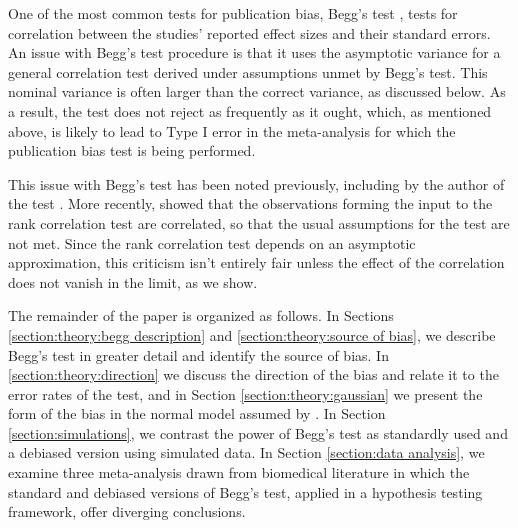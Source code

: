 \documentclass[12pt]{article}
\begin{document}
  One of the most common tests for publication bias, Begg's test
  \citep{begg1994a}, tests for correlation between the studies' reported
  effect sizes and their standard errors.  An issue with Begg's test
  procedure is that it uses the asymptotic variance for a general
  correlation test derived under assumptions unmet by Begg's
  test. This nominal variance is often larger than the correct
  variance, as discussed below. As a result, the test does not reject
  as frequently as it ought, which, as mentioned above, is likely to
  lead to Type I error in the meta-analysis for which the publication
  bias test is being performed.

    

    
    
    

  This issue with Begg's test has been noted previously, including by
  the author of the test \citep{begg1994a,begg1994b}. More recently,
  \citet{gjerdevik2014} showed that the observations forming the input
  to the rank correlation test are correlated, so that the usual
  assumptions for the test are not met. Since the
  rank correlation test depends on an asymptotic approximation, this
  criticism isn't entirely fair unless the effect of the correlation
  does not vanish in the limit, as we show.

  The remainder of the paper is organized as follows. In Sections
  \ref{section:theory:begg description} and \ref{section:theory:source
    of bias}, we describe Begg's test in greater detail and identify
  the source of bias. In \ref{section:theory:direction} we discuss the
  direction of the bias and relate it to the error rates of the test,
  and in Section \ref{section:theory:gaussian} we present the form of
  the bias in the normal model assumed by \citet{begg1994a}. In
  Section \ref{section:simulations}, we contrast the power of Begg's
  test as standardly used and a debiased version using simulated
  data. In Section \ref{section:data analysis}, we examine three
  meta-analysis drawn from biomedical literature in which the standard
  and debiased versions of Begg's test, applied in a hypothesis
  testing framework, offer diverging conclusions.
  
\end{document}
